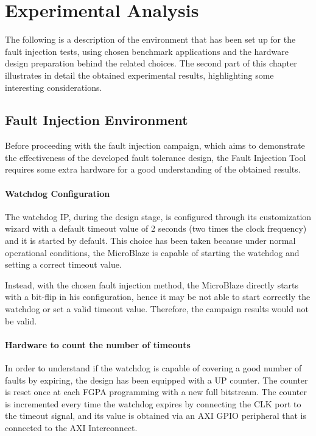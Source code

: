 \chapter{Experimental Analysis}
\label{sec:exp}

The following is a description of the environment that has been set up for the fault injection tests, using chosen benchmark applications and the hardware design preparation behind the related choices. The second part of this chapter illustrates in detail the obtained experimental results, highlighting some interesting considerations.

\section{Fault Injection Environment}

Before proceeding with the fault injection campaign, which aims to demonstrate the effectiveness of the developed fault tolerance design, the Fault Injection Tool requires some extra hardware for a good understanding of the obtained results.

\subsubsection{Watchdog Configuration}
The watchdog IP, during the design stage, is configured through its customization wizard with a default timeout value of 2 seconds (two times the clock frequency) and it is started by default. This choice has been taken because under normal operational conditions, the MicroBlaze is capable of starting the watchdog and setting a correct timeout value.\bigskip
 
Instead, with the chosen fault injection method, the MicroBlaze directly starts with a bit-flip in his configuration, hence it may be not able to start correctly the watchdog or set a valid timeout value. Therefore, the campaign results would not be valid.\bigskip

\subsubsection{Hardware to count the number of timeouts}
In order to understand if the watchdog is capable of covering a good number of faults by expiring, the design has been equipped with a UP counter. The counter is reset once at each FGPA programming with a new full bitstream. The counter is incremented every time the watchdog expires by connecting the CLK port to the timeout signal, and its value is obtained via an AXI GPIO peripheral that is connected to the AXI Interconnect. \bigskip

